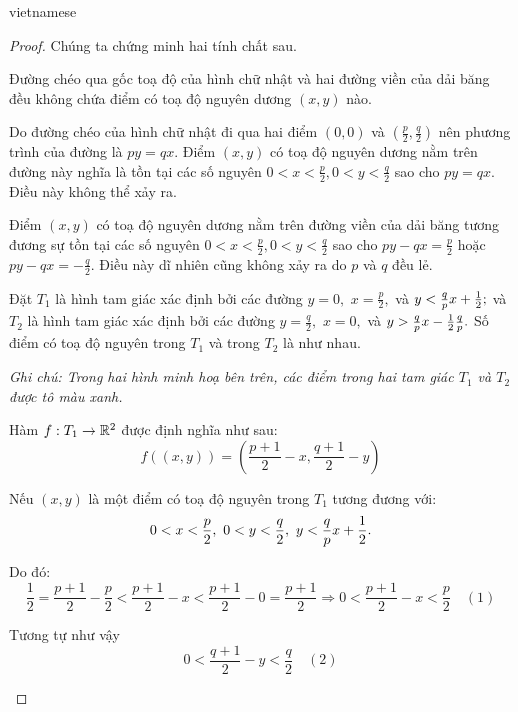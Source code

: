 \documentclass{article}
\begin{document}
\begin{otherlanguage*}{vietnamese}
\begin{proof}
    Chúng ta chứng minh hai tính chất sau.

    \begin{claim*}
        Đường chéo qua gốc toạ độ của hình chữ nhật và hai đường viền của dải băng đều không chứa điểm có toạ độ nguyên dương $(x,y)$ nào.
    \end{claim*}
    \begin{subproof}
        Do đường chéo của hình chữ nhật đi qua hai điểm $(0,0)$ và $(\frac{p}{2}, \frac{q}{2})$ nên phương trình của đường là $py = qx.$
        Điểm $(x,y)$ có toạ độ nguyên dương nằm trên đường này nghĩa là tồn tại các số nguyên $0 < x < \frac{p}{2}, 0 < y < \frac{q}{2}$ sao cho $py = qx.$
        Điều này không thể xảy ra.

        Điểm $(x,y)$ có toạ độ nguyên dương nằm trên đường viền của dải băng tương đương sự tồn tại các số nguyên $0 < x < \frac{p}{2}, 0 < y < \frac{q}{2}$ 
        sao cho $py - qx = \frac{p}{2}$ hoặc $py - qx = -\frac{q}{2}$. Điều này dĩ nhiên cũng không xảy ra do $p$ và $q$ đều lẻ.
    \end{subproof}

\newpage

    \begin{claim*}
        Đặt $T_1$ là hình tam giác xác định bởi các đường $y=0,$ $x=\frac{p}{2},$ và $y < \frac{q}{p} x + \frac{1}{2};$
        và $T_2$ là hình tam giác xác định bởi các đường $y=\frac{q}{2},$ $x=0,$ và $y > \frac{q}{p} x - \frac{1}{2} \frac{q}{p}.$
        Số điểm có toạ độ nguyên trong $T_1$ và trong $T_2$ là như nhau.

        \textit{Ghi chú: Trong hai hình minh hoạ bên trên, các điểm trong hai tam giác $T_1$ và $T_2$ được tô màu xanh.}
    \end{claim*}
    \begin{subproof}
        Hàm $f: T_1 \rightarrow \mathbb R^2$ được định nghĩa như sau:
        \[
            f((x,y)) = \left( \frac{p+1}{2} - x , \frac{q+1}{2} - y\right)
        \]

        Nếu $(x,y)$ là một điểm có toạ độ nguyên trong $T_1$ tương đương với: 
        \[
            0 < x < \frac{p}{2},\ 0 < y < \frac{q}{2},\ y < \frac{q}{p} x + \frac{1}{2}.
        \]

        Do đó:
        \[
            \frac{1}{2} = \frac{p+1}{2} - \frac{p}{2} < \frac{p+1}{2} - x < \frac{p+1}{2} - 0 = \frac{p+1}{2} \Rightarrow 0 < \frac{p+1}{2} - x < \frac{p}{2} \quad (1)
        \]

        Tương tự như vậy 
        \[
            0 < \frac{q+1}{2} - y < \frac{q}{2} \quad (2)
        \]
        

\end{subproof}
\end{proof}
\end{otherlanguage*}
\end{document}
